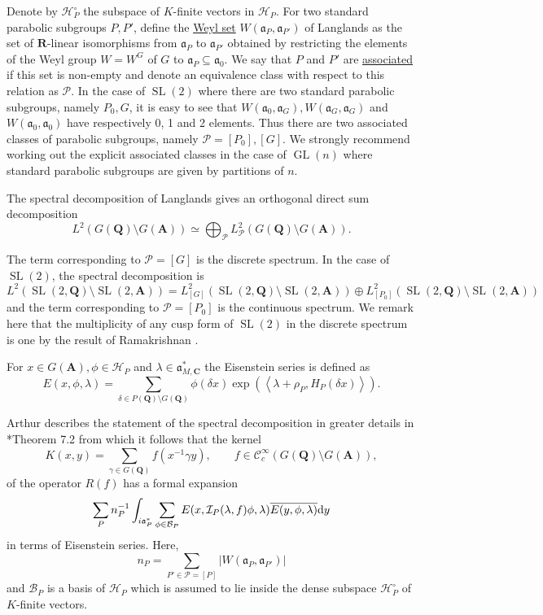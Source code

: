 \documentclass[11pt]{amsart}
\def\A{\mathbf A}
\def\C{\mathbf C}
\def\Q{\mathbf Q}
\def\R{\mathbf R}
\def\BBB{\mathcal B}
\def\CCC{\mathcal C}
\def\HHH{\mathcal H}
\def\III{\mathcal I}
\def\PPP{\mathcal P}
\def\aaa{\mathfrak a}
\def\cb#1{{\color{black}#1}}
\def\d{\text d}
\def\bs{\setminus} 			%
\def\gl{\operatorname{GL}}
\def\Ltwo{L^2}
\def\mod#1{\lvert #1 \rvert} %
\def\se{\subseteq}
\def\sl{\operatorname{SL}}
\def\sprod#1#2{\left\langle #1 , #2 \right\rangle}  %
\theoremstyle{remark}
\begin{document}
Denote by $\HHH_P^\circ$ the subspace of $K$-finite vectors in $\HHH_P$. For two standard parabolic subgroups $P, P'$, define the \underline{Weyl set} $W(\aaa_P, \aaa_{P'})$ of Langlands as the set of $\R$-linear isomorphisms from $\aaa_P$ to $\aaa_{P'}$ obtained by restricting the elements of the Weyl group $W = W^G$ of $G$ to $\aaa_P \se \aaa_0$. We say that $P$ and $P'$ are \underline{associated} if this set is non-empty and denote an equivalence class with respect to this relation as $\PPP$. \cb{In the case of $\sl(2)$ where there are two standard parabolic subgroups, namely $P_0, G$, it is easy to see that $W(\aaa_0, \aaa_G), W(\aaa_G, \aaa_G)$ and $W(\aaa_0, \aaa_0)$ have respectively 0, 1 and 2 elements. Thus there are two associated classes of parabolic subgroups, namely $\PPP = [P_0], [G]$. We strongly recommend working out the explicit associated classes in the case of $\gl(n)$ where standard parabolic subgroups are given by partitions of $n$.}

The spectral decomposition of Langlands gives an orthogonal direct sum decomposition
\[ \Ltwo(G(\Q)\bs G(\A)) \simeq \bigoplus_{\PPP} \Ltwo_\PPP(G(\Q)\bs G(\A)). \]

The term corresponding to $\PPP = [G]$ is the discrete spectrum. 
\cb{In the case of $\sl(2)$, the spectral decomposition is 
\[ \Ltwo(\sl(2, \Q)\bs \sl(2, \A)) = \Ltwo_{[G]} (\sl(2, \Q)\bs \sl(2, \A)) \oplus \Ltwo_{[P_0]} (\sl(2, \Q)\bs \sl(2, \A)) \]
and the term corresponding to $\PPP = [P_0]$ is the continuous spectrum. We remark here that the multiplicity of any cusp form of $\sl(2)$ in the discrete spectrum is one by the result of Ramakrishnan \cite{MR1792292}.}

For $x \in G(\A), \phi \in \HHH_P$ and $\lambda \in \aaa_{M, \C}^*$ the Eisenstein series is defined as
\[ E(x, \phi, \lambda) = \sum_{\delta \in P(\Q) \bs G(\Q)} \phi(\delta x) 
		\exp(\sprod{\lambda + \rho_P}{H_P(\delta x)}). \]

Arthur describes the statement of the spectral decomposition in greater details in \cite{clay}*{Theorem 7.2} from which it follows that the kernel 
\[ K(x, y) = \sum_{\gamma \in G(\Q)} f(x^{-1}\gamma y) , \qquad f \in \CCC_c^\infty(G(\Q)\bs G(\A)),\]
of the operator $R(f)$ has a formal expansion
\[ \sum_{P} n_P^{-1} \int_{i\aaa_P^*} \sum_{\phi \in \BBB_P} E(x, \III_P(\lambda, f)\phi, \lambda) 
		\overline{E(y, \phi, \lambda)} \d y \]
in terms of Eisenstein series. Here, 
\[ n_P = \sum_{P' \in \PPP = [P]} \mod{W(\aaa_P, \aaa_{P'})} \]
and $\BBB_P$ is a basis of $\HHH_P$ which is assumed to lie inside the dense subspace $\HHH_P^\circ$ of $K$-finite vectors. 
\end{document}
